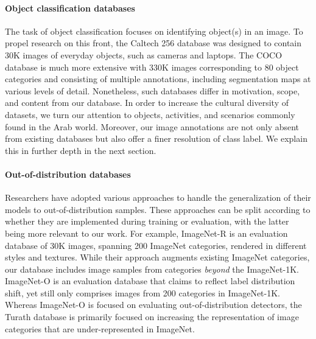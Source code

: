 \documentclass{article}
\begin{document}
\paragraph{Object classification databases}
The task of object classification focuses on identifying object(s) in an image. To propel research on this front, the Caltech 256 database \cite{Griffin2007} was designed to contain 30K images of everyday objects, such as cameras and laptops. The COCO database \cite{Lin2014} is much more extensive with 330K images corresponding to 80 object categories and consisting of multiple annotations, including segmentation maps at various levels of detail. Nonetheless, such databases differ in motivation, scope, and content from our database. In order to increase the cultural diversity of datasets, we turn our attention to objects, activities, and scenarios commonly found in the Arab world. Moreover, our image annotations are not only absent from existing databases but also offer a finer resolution of class label. We explain this in further depth in the next section.  

\paragraph{Out-of-distribution databases}
Researchers have adopted various approaches to handle the generalization of their models to out-of-distribution samples. These approaches can be split according to whether they are implemented during training or evaluation, with the latter being more relevant to our work. For example, ImageNet-R \cite{Hendrycks2020OOD} is an evaluation database of 30K images, spanning 200 ImageNet categories, rendered in different styles and textures. While their approach augments existing ImageNet categories, our database includes image samples from categories \textit{beyond} the ImageNet-1K. ImageNet-O \cite{Hendrycks2019Adversarial} is an evaluation database that claims to reflect label distribution shift, yet still only comprises images from 200 categories in ImageNet-1K. Whereas ImageNet-O is focused on evaluating out-of-distribution detectors, the Turath database is primarily focused on increasing the representation of image categories that are under-represented in ImageNet.

\end{document}
